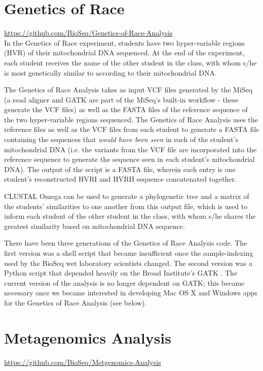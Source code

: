 \documentclass{report}
\begin{document}
\section{Genetics of Race}
\url{https://github.com/BioSeq/Genetics-of-Race-Analysis} \\

\noindent In the Genetics of Race experiment, students have two hyper-variable regions (HVR) of their mitochondrial DNA sequenced. At the end of the experiment, each student receives the name of the other student in the class, with whom s/he is most genetically similar to according to their mitochondrial DNA. 

The Genetics of Race Analysis takes as input VCF files generated by the MiSeq (a read aligner and GATK are part of the MiSeq's built-in workflow - these generate the VCF files) as well as the FASTA files of the reference sequence of the two hyper-variable regions sequenced. The Genetics of Race Analysis uses the reference files as well as the VCF files from each student to generate a FASTA file containing the sequences that \emph{would have been seen} in each of the student's mitochondrial DNA (i.e. the variants from the VCF file are incorporated into the reference sequence to generate the sequence seen in each student's mitochondrial DNA). The output of the script is a FASTA file, wherein each entry is one student's reconstructed HVRI and HVRII sequence concatenated together.

CLUSTAL Omega can be used to generate a phylogenetic tree and a matrix of the students' similarities to one another from this output file, which is used to inform each student of the other student in the class, with whom s/he shares the greatest similarity based on mitochondrial DNA sequence.

There have been three generations of the Genetics of Race Analysis code. The first version was a shell script that became insufficient once the sample-indexing used by the BioSeq wet laboratory scientists changed. The second version was a Python script that depended heavily on the Broad Institute's GATK  \cite{mckenna2010genome}. The current version of the analysis is no longer dependent on GATK; this became necessary once we became interested in developing Mac OS X and Windows apps for the Genetics of Race Analysis (see below).

\section{Metagenomics Analysis}
\url{https://github.com/BioSeq/Metgenomics-Analysis}\\
\end{document}
